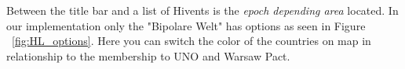 Between the title bar and a list of Hivents is the \textit{epoch depending area} located. In our implementation only the "Bipolare Welt" has options as seen in Figure ~\ref{fig:HL_options}. Here you can switch the color of the countries on map in relationship to the membership to UNO and Warsaw Pact.

